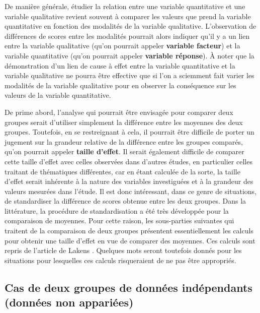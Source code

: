 \documentclass[
  french,
]{book}
\begin{document}
De manière générale, étudier la relation entre une variable quantitative et une variable qualitative revient souvent à comparer les valeurs que prend la variable quantitative en fonction des modalités de la variable qualitative. L'observation de différences de scores entre les modalités pourrait alors indiquer qu'il y a un lien entre la variable qualitative (qu'on pourrait appeler \textbf{variable facteur}) et la variable quantitative (qu'on pourrait appeler \textbf{variable réponse}). À noter que la démonstration d'un lien de cause à effet entre la variable quantitative et la variable qualitative ne pourra être effective que si l'on a sciemment fait varier les modalités de la variable qualitative pour en observer la conséquence sur les valeurs de la variable quantitative.

De prime abord, l'analyse qui pourrait être envisagée pour comparer deux groupes serait d'utiliser simplement la différence entre les moyennes des deux groupes. Toutefois, en se restreignant à cela, il pourrait être difficile de porter un jugement sur la grandeur relative de la différence entre les groupes comparés, qu'on pourrait appeler \textbf{taille d'effet}. Il serait également difficile de comparer cette taille d'effet avec celles observées dans d'autres études, en particulier celles traitant de thématiques différentes, car en étant calculée de la sorte, la taille d'effet serait inhérente à la nature des variables investiguées et à la grandeur des valeurs mesurées dans l'étude. Il est donc intéressant, dans ce genre de situations, de standardiser la différence de scores obtenue entre les deux groupes. Dans la littérature, la procédure de standardisation a été très développée pour la comparaison de moyennes. Pour cette raison, les sous-parties suivantes qui traitent de la comparaison de deux groupes présentent essentiellement les calculs pour obtenir une taille d'effet en vue de comparer des moyennes. Ces calculs sont repris de l'article de Lakens \autocite*{lakensCalculatingReportingEffect2013}. Quelques mots seront toutefois donnés pour les situations pour lesquelles ces calculs risqueraient de ne pas être appropriés.

\hypertarget{cas-de-deux-groupes-de-donnuxe9es-induxe9pendants-donnuxe9es-non-appariuxe9es}{%
\subsection{Cas de deux groupes de données indépendants (données non appariées)}\label{cas-de-deux-groupes-de-donnuxe9es-induxe9pendants-donnuxe9es-non-appariuxe9es}}
\end{document}
